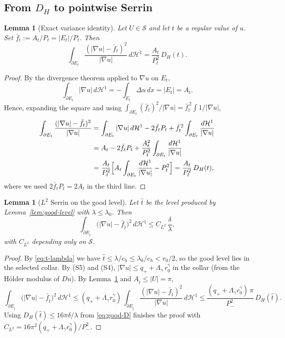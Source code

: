 \documentclass[11pt]{amsart}
\newtheorem{lemma}[theorem]{Lemma}
\newcommand{\Et}{E_{\hat t}}
\newcommand{\HH}{\mathcal H}
\newcommand{\Sclass}{\mathcal S}
\begin{document}
\subsection{From \(D_H\) to pointwise Serrin}\label{ss:pointwise-serrin}

\begin{lemma}[Exact variance identity]\label{lem:variance}
Let \(U\in\Sclass\) and let \(t\) be a regular value of \(u\).  Set
\(\bar f_t:=A_t/P_t=|E_t|/P_t\).  Then
\begin{equation}\label{eq:variance}
   \int_{\partial E_t}\frac{(|\nabla u|-\bar f_t)^2}{|\nabla u|}\,
      d\HH^1
      =
   \frac{A_t}{P_t^{2}}\,D_H(t).
\end{equation}
\end{lemma}

\begin{proof}
By the divergence theorem applied to \(\nabla u\) on \(E_t\),
\[
   \int_{\partial E_t}|\nabla u|\,d\HH^1
      =-\int_{E_t}\Delta u\,dx=|E_t|=A_t.
\]
Hence, expanding the square and using \(\int_{\partial E_t}
(\bar f_t)^2/|\nabla u|=\bar f_t^{\,2}\int 1/|\nabla u|\),
\[
\begin{aligned}
\int_{\partial E_t}\frac{(|\nabla u|-\bar f_t)^2}{|\nabla u|}
   &=
   \int_{\partial E_t}|\nabla u|\,d\HH^1
   -2\bar f_t P_t
   +\bar f_t^{\,2}\int_{\partial E_t}\frac{d\HH^1}{|\nabla u|}\\
   &=A_t-2\bar f_t P_t
     +\frac{A_t^2}{P_t^2}\int_{\partial E_t}\frac{d\HH^1}{|\nabla u|}\\
   &=\frac{A_t}{P_t^2}
     \Bigl[A_t\int_{\partial E_t}\frac{d\HH^1}{|\nabla u|}-P_t^2\Bigr]
   =\frac{A_t}{P_t^2}\,D_H(t),
\end{aligned}
\]
where we used \(2\bar f_t P_t=2A_t\) in the third line.
\end{proof}

\begin{lemma}[\(L^2\) Serrin on the good level]\label{lem:L2}
Let \(\hat t\) be the level produced by Lemma~\ref{lem:good-level} with
\(\lambda\le\lambda_0\).  Then
\begin{equation}\label{eq:L2-serrin}
   \int_{\partial \Et}
      \bigl(|\nabla u|-\bar f_{\hat t}\bigr)^2\,d\HH^1
      \le
   C_{L^2}\,\frac{\delta}{\lambda},
\end{equation}
with \(C_{L^2}\) depending only on \(\Sclass\).
\end{lemma}

\begin{proof}
By \eqref{eq:t-lambda} we have \(\hat t\le\lambda/c_h\le\lambda_0/c_h<
r_0/2\), so the good level lies in the selected collar.  By (S5) and
(S4), $|\nabla u|\le q_++\Lambda_\gamma\,r_0^\gamma$ in the collar
(from the Hölder modulus of $Du$).  By Lemma~\ref{lem:variance} and
$A_{\hat t}\le|U|=\pi$,
\[
   \int_{\partial\Et}
      \bigl(|\nabla u|-\bar f_{\hat t}\bigr)^2\,d\HH^1
      \le
   (q_++\Lambda_\gamma r_0^\gamma)\,
   \int_{\partial\Et}
      \frac{(|\nabla u|-\bar f_{\hat t})^2}{|\nabla u|}\,d\HH^1
      \le
   \frac{(q_++\Lambda_\gamma r_0^\gamma)\,\pi}{P_-^2}\,D_H(\hat t).
\]
Using \(D_H(\hat t)\le 16\pi\delta/\lambda\) from \eqref{eq:good-D}
finishes the proof with
$C_{L^2}=16\pi^2(q_++\Lambda_\gamma r_0^\gamma)/P_-^2$.
\end{proof}
\end{document}
